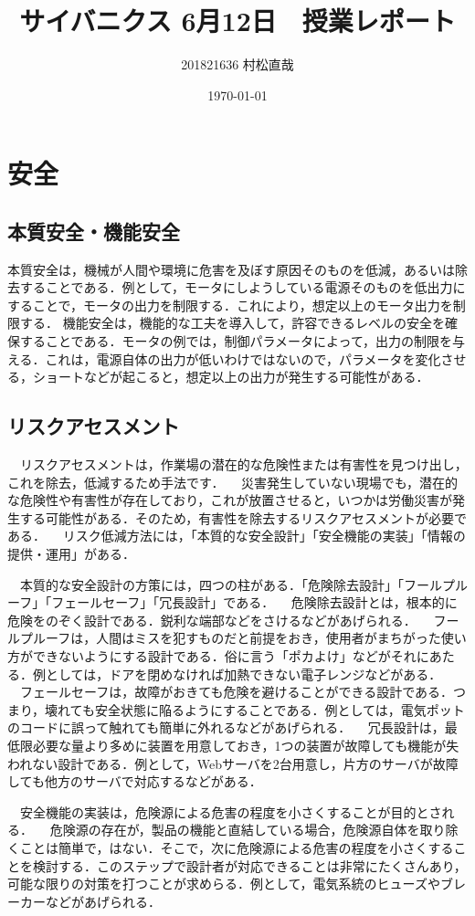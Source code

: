 \documentclass[uplatex,a4paper]{jsarticle}
\title{サイバニクス 6月12日　授業レポート}
\author{201821636 村松直哉}
\date{\today}
\begin{document}
\maketitle
%
%
\section{安全}
\subsection{本質安全・機能安全}
本質安全は，機械が人間や環境に危害を及ぼす原因そのものを低減，あるいは除去することである．例として，モータにしようしている電源そのものを低出力にすることで，モータの出力を制限する．これにより，想定以上のモータ出力を制限する．
機能安全は，機能的な工夫を導入して，許容できるレベルの安全を確保することである．モータの例では，制御パラメータによって，出力の制限を与える．これは，電源自体の出力が低いわけではないので，パラメータを変化させる，ショートなどが起こると，想定以上の出力が発生する可能性がある．

\subsection{リスクアセスメント}
　リスクアセスメントは，作業場の潜在的な危険性または有害性を見つけ出し，これを除去，低減するため手法です．
　災害発生していない現場でも，潜在的な危険性や有害性が存在しており，これが放置させると，いつかは労働災害が発生する可能性がある．そのため，有害性を除去するリスクアセスメントが必要である．
　リスク低減方法には，「本質的な安全設計」「安全機能の実装」「情報の提供・運用」がある．

　本質的な安全設計の方策には，四つの柱がある．「危険除去設計」「フールプルーフ」「フェールセーフ」「冗長設計」である．
　危険除去設計とは，根本的に危険をのぞく設計である．鋭利な端部などをさけるなどがあげられる．
　フールプルーフは，人間はミスを犯すものだと前提をおき，使用者がまちがった使い方ができないようにする設計である．俗に言う「ポカよけ」などがそれにあたる．例としては，ドアを閉めなければ加熱できない電子レンジなどがある．
　フェールセーフは，故障がおきても危険を避けることができる設計である．つまり，壊れても安全状態に陥るようにすることである．例としては，電気ポットのコードに誤って触れても簡単に外れるなどがあげられる．
　冗長設計は，最低限必要な量より多めに装置を用意しておき，1つの装置が故障しても機能が失われない設計である．例として，Webサーバを2台用意し，片方のサーバが故障しても他方のサーバで対応するなどがある．

　安全機能の実装は，危険源による危害の程度を小さくすることが目的とされる．
　危険源の存在が，製品の機能と直結している場合，危険源自体を取り除くことは簡単で，はない．そこで，次に危険源による危害の程度を小さくすることを検討する．このステップで設計者が対応できることは非常にたくさんあり，可能な限りの対策を打つことが求めらる．例として，電気系統のヒューズやブレーカーなどがあげられる．
\end{document}
